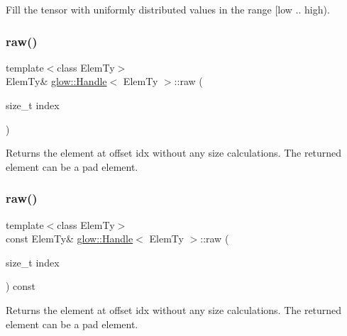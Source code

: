 Fill the tensor with uniformly distributed values in the range \mbox{[}low .. high). \mbox{\label{classglow_1_1_handle_aea03569f22a6d701b671403b5d4c2d43}} 
\subsubsection{\texorpdfstring{raw()}{raw()}\hspace{0.1cm}{\footnotesize\ttfamily [1/2]}}
{\footnotesize\ttfamily template$<$class Elem\+Ty$>$ \\
Elem\+Ty\& \hyperlink{classglow_1_1_handle}{glow\+::\+Handle}$<$ Elem\+Ty $>$\+::raw (\begin{DoxyParamCaption}\item[{size\+\_\+t}]{index }\end{DoxyParamCaption})\hspace{0.3cm}{\ttfamily [inline]}}

\begin{DoxyReturn}{Returns}
the element at offset {\ttfamily idx} without any size calculations. The returned element can be a pad element. 
\end{DoxyReturn}
\mbox{\label{classglow_1_1_handle_ae9004553e87770e18aa2396d88bfeeff}} 
\subsubsection{\texorpdfstring{raw()}{raw()}\hspace{0.1cm}{\footnotesize\ttfamily [2/2]}}
{\footnotesize\ttfamily template$<$class Elem\+Ty$>$ \\
const Elem\+Ty\& \hyperlink{classglow_1_1_handle}{glow\+::\+Handle}$<$ Elem\+Ty $>$\+::raw (\begin{DoxyParamCaption}\item[{size\+\_\+t}]{index }\end{DoxyParamCaption}) const\hspace{0.3cm}{\ttfamily [inline]}}

\begin{DoxyReturn}{Returns}
the element at offset {\ttfamily idx} without any size calculations. The returned element can be a pad element. 
\end{DoxyReturn}
\mbox{\label{classglow_1_1_handle_a885d9052ce52d0125e99e47b45bc5fcc}} 
